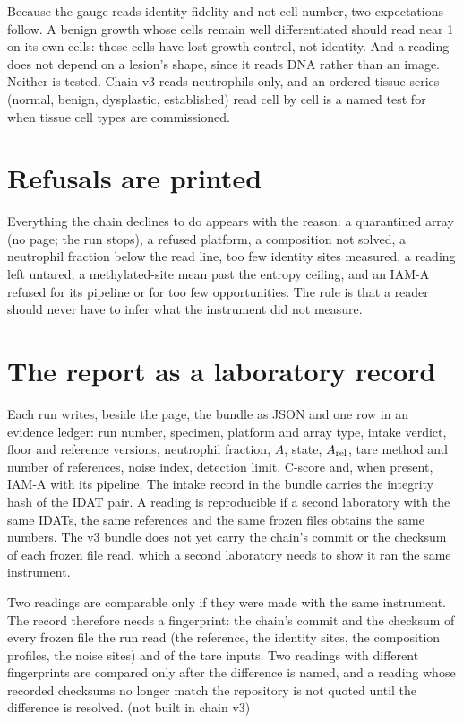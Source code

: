 Because the gauge reads identity fidelity and not cell number, two expectations follow. A benign growth whose cells remain well
differentiated should read near 1 on its own cells: those cells have lost growth control, not identity. And a reading does not depend
on a lesion's shape, since it reads DNA rather than an image. \prediction{} Neither is tested. Chain v3 reads neutrophils only, and an
ordered tissue series (normal, benign, dysplastic, established) read cell by cell is a named test for when tissue cell types are
commissioned. \openprob

\section{Refusals are printed}

Everything the chain declines to do appears with the reason: a quarantined array (no page; the run stops), a refused platform, a composition not solved, a
neutrophil fraction below the read line, too few identity sites measured, a reading left untared, a methylated-site mean past the entropy ceiling, and an IAM-A
refused for its pipeline or for too few opportunities. The rule is that a reader should never have to infer what the instrument did not measure.

\section{The report as a laboratory record}

Each run writes, beside the page, the bundle as JSON and one row in an evidence ledger: run number, specimen, platform and array type, intake verdict, floor and
reference versions, neutrophil fraction, $A$, state, $A_{\rm rel}$, tare method and number of references, noise index, detection limit, C-score and, when present,
IAM-A with its pipeline. The intake record in the bundle carries the integrity hash of the IDAT pair. A reading is reproducible if a second laboratory with the same
IDATs, the same references and the same frozen files obtains the same numbers. The v3 bundle does not yet carry the chain's commit or the checksum of each frozen
file read, which a second laboratory needs to show it ran the same instrument. \openprob

Two readings are comparable only if they were made with the same instrument. The record therefore needs a fingerprint: the chain's
commit and the checksum of every frozen file the run read (the reference, the identity sites, the composition profiles, the noise
sites) and of the tare inputs. Two readings with different fingerprints are compared only after the difference is named, and a
reading whose recorded checksums no longer match the repository is not quoted until the difference is resolved. \openprob{} (not
built in chain v3)
